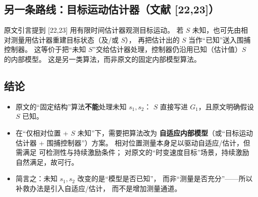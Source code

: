 \subsection{另一条路线：目标运动估计器（文献 [22,23]）}

原文引言提到 [22,23] 用有限时间估计器观测目标运动。
若 $S$ 未知，也可先由相对测量用估计器重建目标状态（及/或 $S$），
再把估计出的 $S$ 当作“已知”送入围捕控制器。
这等价于把“未知 $S$”交给估计器处理，控制器仍沿用已知（估计值）$S$ 的内部模型。
这是另一类算法，而非原文的固定内部模型算法。

\subsection{结论}

\begin{itemize}
  \item 原文的“固定结构”算法\textbf{不能}处理未知 $s_1,s_2$：
    $S$ 直接写进 $G_1$，且原文明确假设 $S$ 已知。
  \item 在“仅相对位置 + $S$ 未知”下，需要把算法改为
    \textbf{自适应内部模型}（或“目标运动估计器 + 围捕控制器”）方案。
    相对位置测量本身足以驱动自适应/估计，但需满足
    可检测性与持续激励条件；
    对原文的“时变速度目标”场景，持续激励自然满足，故可行。
  \item 简言之：未知 $s_1,s_2$ 改变的是“模型是否已知”，
    而非“测量是否充分”——所以补救办法是引入自适应/估计，
    而不是增加测量通道。
\end{itemize}
